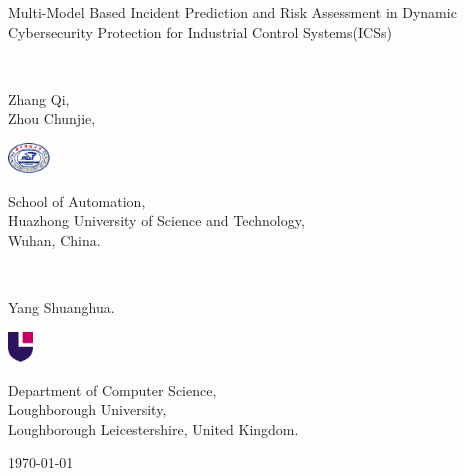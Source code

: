 \begin{frame}\label{Title}
    \vfill
    \centering
    \large
    Multi-Model Based Incident Prediction and Risk Assessment in Dynamic Cybersecurity Protection for Industrial Control Systems(ICSs)\\
    \vspace{15pt}\\
    \begin{minipage}[m]{3cm}
        \Bold \small Zhang Qi,\\[2pt]
        Zhou Chunjie,
    \end{minipage}\hspace{-15pt}
    \begin{minipage}[m]{1.5cm}
        \centering
        \includegraphics[height=0.8cm]{Logos/HUSTLogoWithoutSubline.pdf}
    \end{minipage}
    \begin{minipage}[m]{0.55\textwidth}
        \Normal \scriptsize School of Automation,\\Huazhong University of Science and Technology,\\Wuhan, China.
    \end{minipage}\\[10pt]
    \begin{minipage}[m]{3cm}
        \Bold \small Yang Shuanghua.
    \end{minipage}\hspace{-15pt}
    \begin{minipage}[m]{1.5cm}
        \centering
        \includegraphics[height=0.8cm]{Logos/LULogoWithoutSubline.pdf}
    \end{minipage}
    \begin{minipage}[m]{0.55\textwidth}
        \Normal \scriptsize Department of Computer Science,\\
        Loughborough University,\\
        Loughborough Leicestershire, United Kingdom.
    \end{minipage}\hfill
    \vfill
    \centering
    \today
\end{frame}

